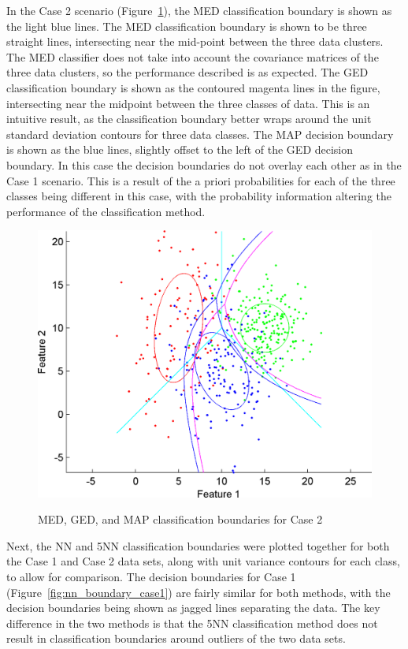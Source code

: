 \documentclass[article, 1.5space, letterpaper, 12pt, oneside, header, footer]{SydeClass}
\begin{document}
In the Case 2 scenario (Figure~\ref{fig:med_ged_map_classifier_case2}), the MED classification boundary is shown as the light blue lines. The MED classification boundary is shown to be three straight lines, intersecting near the mid-point between the three data clusters. The MED classifier does not take into account the covariance matrices of the three data clusters, so the performance described is as expected. The GED classification boundary is shown as the contoured magenta lines in the figure, intersecting near the midpoint between the three classes of data. This is an intuitive result, as the classification boundary better wraps around the unit standard deviation contours for three data classes. The MAP decision boundary is shown as the blue lines, slightly offset to the left of the GED decision boundary. In this case the decision boundaries do not overlay each other as in the Case 1 scenario. This is a result of the a priori probabilities for each of the three classes being different in this case, with the probability information altering the performance of the classification method.

\begin{figure}[ht]
\centering
	{
	\includegraphics[width=0.45\linewidth]{fig2b-AB_MED_MICD_MAP}
	}
	
	\caption{MED, GED, and MAP classification boundaries for Case 2}
	\label{fig:med_ged_map_classifier_case2}
\end{figure}

Next, the NN and 5NN classification boundaries were plotted together for both the Case 1 and Case 2 data sets, along with unit variance contours for each class, to allow for comparison. The decision boundaries for Case 1 (Figure~\ref{fig:nn_boundary_case1}) are fairly similar for both methods, with the decision boundaries being shown as jagged lines separating the data. The key difference in the two methods is that the 5NN classification method does not result in classification boundaries around outliers of the two data sets.
\end{document}
